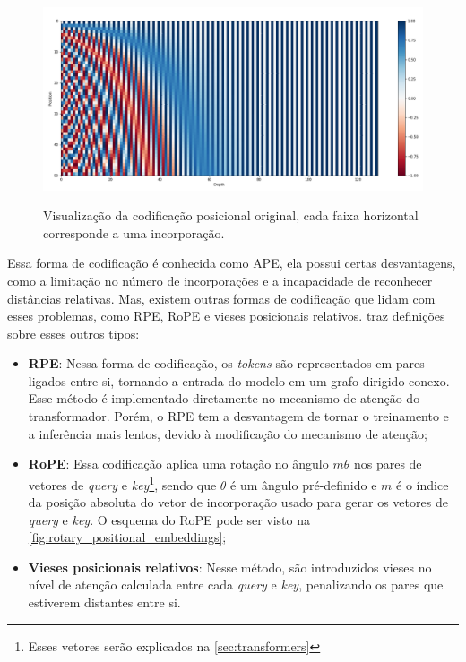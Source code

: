 \begin{figure}[ht]
    \centering
    \caption{\small Visualização da codificação posicional original, cada faixa horizontal corresponde a uma incorporação.}
    \includegraphics[width=1.0\columnwidth,keepaspectratio]{images/absolute_positional_embeddings.png}
    \label{fig:absolute_positional_embeddings}
\end{figure}

Essa forma de codificação é conhecida como \ac{APE}, ela possui certas desvantagens, como a limitação no número de
incorporações e a incapacidade de reconhecer distâncias relativas. Mas, existem outras formas de codificação que lidam
com esses problemas, como \ac{RPE}, \acl{RoPE} e vieses posicionais relativos. \textcite{llm_survey_2024} traz
definições sobre esses outros tipos:

\begin{itemize}
    \item \textbf{\ac{RPE}}: Nessa forma de codificação, os \textit{tokens} são representados em pares ligados entre si, tornando
          a entrada do modelo em um grafo dirigido conexo. Esse método é implementado diretamente no mecanismo de atenção do
          transformador. Porém, o \ac{RPE} tem a desvantagem de tornar o treinamento e a inferência mais lentos, devido à
          modificação do mecanismo de atenção;
    \item \textbf{\ac{RoPE}}: Essa codificação aplica uma rotação no ângulo \begin{math}m\theta\end{math} nos pares de vetores de
          \textit{query} e \textit{key}\footnote{Esses vetores serão explicados na \autoref{sec:transformers}}, sendo que \begin{math}\theta\end{math} é um ângulo
          pré-definido e \begin{math}m\end{math} é o índice da posição absoluta do vetor de incorporação usado para gerar os vetores de \textit{query} e \textit{key}. O
          esquema do \ac{RoPE} pode ser visto na \autoref{fig:rotary_positional_embeddings};
    \item \textbf{Vieses posicionais relativos}: Nesse método, são introduzidos vieses no nível de atenção calculada entre cada
          \textit{query} e \textit{key}, penalizando os pares que estiverem distantes entre si.
\end{itemize}

